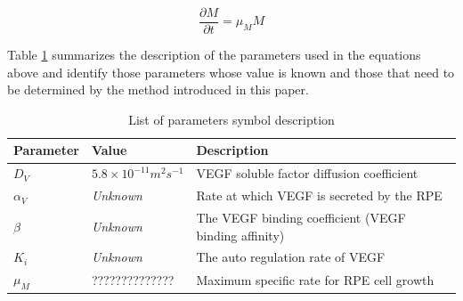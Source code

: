 \begin{equation}
\frac{\partial M}{\partial t}=   \mu _{M} M
\label{Cell_Growth}
\end{equation}

Table \ref{parameters} summarizes the description of the parameters used in the equations above and identify those parameters whose value is known and those that need to be determined by the method introduced in this paper.

\begin{table}[ht]
\caption{ List of parameters symbol description } %
\centering
\begin{footnotesize}
\begin{tabular}{l l l}
\hline
Parameter   &  Value & Description\\ \hline \hline
$D_{V}$     & $5.8 \times 10^{-11} m^{2} s^{-1}$ & VEGF soluble factor diffusion coefficient\\
$\alpha_V $ & \textsl{Unknown}                   & Rate at which VEGF is secreted by the RPE \\
$\beta $    &  \textsl{Unknown}                  & The VEGF binding coefficient (VEGF binding affinity) \\
$K_i$       &  \textsl{Unknown}                  & The auto regulation rate of VEGF \\
$\mu _{M}$  &  ??????????????                    & Maximum specific rate for RPE cell growth \\
 [1ex]      %
\hline 
\end{tabular}
\end{footnotesize}
\label{parameters} 
\end{table}

